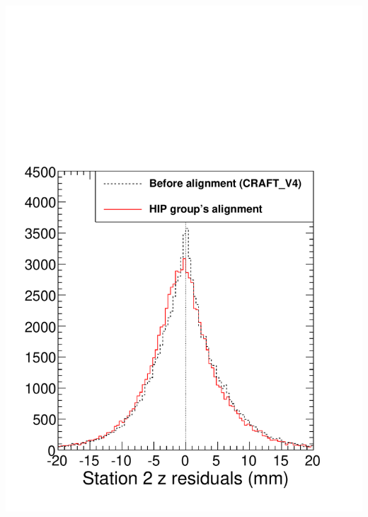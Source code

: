 \documentclass[compress]{beamer}
\begin{document}
\begin{frame}
\begin{columns}
\includegraphics[width=\linewidth]{rawz_station2.pdf}


\end{columns}
\end{frame}
\end{document}
